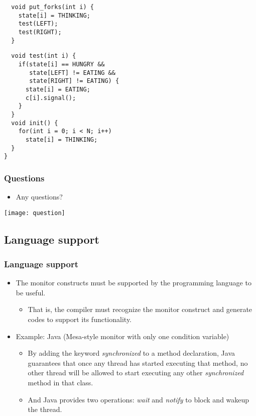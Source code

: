 \documentclass[CJKutf8,dvipsnames,table]{beamer}
\begin{document}
\begin{CJK*}{UTF8}{song}
\begin{frame}[fragile]
\begin{minipage}[c]{0.5\textwidth}
\begin{lstlisting}
  void put_forks(int i) {
    state[i] = THINKING;
    test(LEFT);
    test(RIGHT);
  }
\end{lstlisting}
  \end{minipage}

\begin{lstlisting}
  void test(int i) {
    if(state[i] == HUNGRY &&
       state[LEFT] != EATING &&
       state[RIGHT] != EATING) {
      state[i] = EATING;
      c[i].signal();
    }
  }
  void init() {
    for(int i = 0; i < N; i++)
      state[i] = THINKING;
  }
}
\end{lstlisting}

\end{frame}

  \begin{frame}
  \frametitle{Questions}
  \begin{itemize}
  \item{Any questions?}
  \end{itemize}
  \begin{center}
    \texttt{[image: question]}
  \end{center}
  \end{frame}

  \subsection{Language support}

  \begin{frame}
 \frametitle{Language support} \pause
 \begin{itemize}
 \item{The monitor constructs must be supported by the programming language to be useful.} \pause
   \begin{itemize}
   \item{That is, the compiler must recognize the monitor construct and
     generate codes to support its functionality.} \pause
   \end{itemize}
 \item{Example: Java (Mesa-style monitor with only one condition variable)} \pause
     \begin{itemize}
     \item{By adding the keyword \emph{synchronized} to a method declaration,
       Java guarantees that once any thread has started executing that method,
       no other thread will be allowed to start executing any other \emph{synchronized} method in that class.} \pause
     \item{And Java provides two operations: \emph{wait} and \emph{notify} to block and wakeup the thread.}
     \end{itemize}
 \end{itemize}
  \end{frame}


\end{CJK*}
\end{document}
